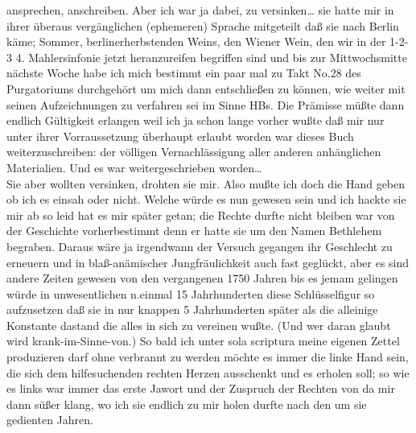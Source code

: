 \documentclass[
]{article}
\begin{document}
ansprechen, anschreiben. Aber ich war ja dabei, zu versinken\ldots{} sie
hatte mir in ihrer überaus vergänglichen (ephemeren) Sprache mitgeteilt
daß sie nach Berlin käme; Sommer, berlinerherbstenden Weins, den Wiener
Wein, den wir in der 1-2-3 4. Mahlersinfonie jetzt heranzureifen
begriffen sind und bis zur Mittwochsmitte nächste Woche habe ich mich
bestimmt ein paar mal zu Takt No.28 des Purgatoriums durchgehört um mich
dann entschließen zu können, wie weiter mit seinen Aufzeichnungen zu
verfahren sei im Sinne HB\textquotesingle s. Die Prämisse müßte dann
endlich Gültigkeit erlangen weil ich ja schon lange vorher wußte daß mir
nur unter ihrer Vorraussetzung überhaupt erlaubt worden war dieses Buch
weiterzuschreiben: der völligen Vernachlässigung aller anderen
anhänglichen Materialien. Und es war weitergeschrieben worden\ldots{}\\
Sie aber wollten versinken, drohten sie mir. Also mußte ich doch die
Hand geben ob ich es einsah oder nicht. Welche würde es nun gewesen sein
und ich hackte sie mir ab so leid hat es mir später getan; die Rechte
durfte nicht bleiben war von der Geschichte vorherbestimmt denn er hatte
sie um den Namen Bethlehem begraben. Daraus wäre ja irgendwann der
Versuch gegangen ihr Geschlecht zu erneuern und in blaß-anämischer
Jungfräulichkeit auch fast geglückt, aber es sind andere Zeiten gewesen
von den vergangenen 1750 Jahren bis es jemam gelingen würde in
unwesentlichen n.einmal 15 Jahrhunderten diese Schlüsselfigur so
aufzusetzen daß sie in nur knappen 5 Jahrhunderten später als die
alleinige Konstante dastand die alles in sich zu vereinen wußte. (Und
wer daran glaubt wird krank-im-Sinne-von.) So bald ich unter sola
scriptura meine eigenen Zettel produzieren darf ohne verbrannt zu werden
möchte es immer die linke Hand sein, die sich dem hilfesuchenden rechten
Herzen ausschenkt und es erholen soll; so wie es links war immer das
erste Jawort und der Zuspruch der Rechten von da mir dann süßer klang,
wo ich sie endlich zu mir holen durfte nach den um sie gedienten Jahren.
\end{document}
